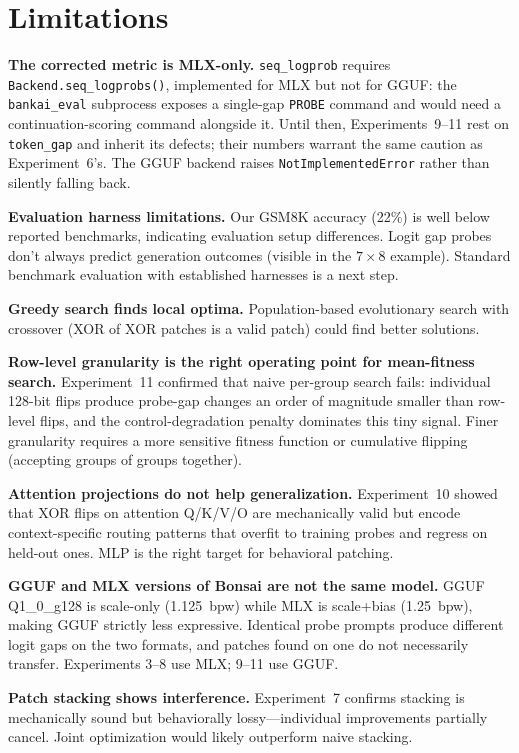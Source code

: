 \documentclass[11pt,a4paper]{article}
\begin{document}
\section{Limitations}
\label{sec:limitations}

\textbf{The corrected metric is MLX-only.} \texttt{seq\_logprob} requires
\texttt{Backend.seq\_logprobs()}, implemented for MLX but not for GGUF: the
\texttt{bankai\_eval} subprocess exposes a single-gap \texttt{PROBE} command and
would need a continuation-scoring command alongside it. Until then,
Experiments~9--11 rest on \texttt{token\_gap} and inherit its defects; their
numbers warrant the same caution as Experiment~6's. The GGUF backend raises
\texttt{NotImplementedError} rather than silently falling back.


\textbf{Evaluation harness limitations.} Our GSM8K accuracy (22\%) is
well below reported benchmarks, indicating evaluation setup differences.
Logit gap probes don't always predict generation outcomes (visible in
the $7\times8$ example). Standard benchmark evaluation with established
harnesses is a next step.

\textbf{Greedy search finds local optima.} Population-based evolutionary
search with crossover (XOR of XOR patches is a valid patch) could find
better solutions.

\textbf{Row-level granularity is the right operating point for mean-fitness
search.} Experiment~11 confirmed that naive per-group search fails:
individual 128-bit flips produce probe-gap changes an order of magnitude
smaller than row-level flips, and the control-degradation penalty dominates
this tiny signal. Finer granularity requires a more sensitive fitness
function or cumulative flipping (accepting groups of groups together).

\textbf{Attention projections do not help generalization.} Experiment~10
showed that XOR flips on attention Q/K/V/O are mechanically valid but
encode context-specific routing patterns that overfit to training probes
and regress on held-out ones. MLP is the right target for behavioral
patching.

\textbf{GGUF and MLX versions of Bonsai are not the same model.} GGUF
Q1\_0\_g128 is scale-only (1.125~bpw) while MLX is scale+bias (1.25~bpw),
making GGUF strictly less expressive. Identical probe prompts produce
different logit gaps on the two formats, and patches found on one do
not necessarily transfer. Experiments 3--8 use MLX; 9--11 use GGUF.

\textbf{Patch stacking shows interference.} Experiment~7 confirms
stacking is mechanically sound but behaviorally lossy---individual
improvements partially cancel. Joint optimization would likely
outperform naive stacking.
\end{document}
